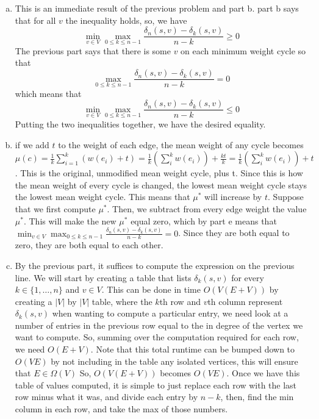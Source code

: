 \documentclass{article}
\begin{document}
\begin{enumerate}[a.]
\item
This is an immediate result of the previous problem and part b. part b says that for all $v$ the inequality holds, so, we have
\[
\min_{v\in V} \max_{0\le k\le n-1} \frac{\delta_n(s,v) - \delta_k(s,v)}{n-k} \ge 0
\]
The previous part says that there is some $v$ on each minimum weight cycle so that
\[
\max_{0\le k\le n-1} \frac{\delta_n(s,v) - \delta_k(s,v)}{n-k} = 0
\]
which means that
\[
\min_{v\in V} \max_{0\le k\le n-1} \frac{\delta_n(s,v) - \delta_k(s,v)}{n-k} \le 0
\]
Putting the two inequalities together, we have the desired equality.

\item
if we add $t$ to the weight of each edge, the mean weight of any cycle becomes $\mu(c)= \frac{1}{k} \sum_{i=1}^k(w(e_i) + t) = \frac{1}{k}\left(\sum_{i}^kw(e_i)\right) + \frac{kt}{k} = \frac{1}{k}\left(\sum_{i}^kw(e_i)\right) + t$. This is the original, unmodified mean weight cycle, plus t. Since this is how the mean weight of every cycle is changed, the lowest mean weight cycle stays the lowest mean weight cycle. This means that $\mu^*$ will increase by $t$. Suppose that we first compute $\mu^*$. Then, we subtract from every edge weight the value $\mu^*$. This will make the new $\mu^*$ equal zero, which by part e means that $\min_{v\in V} \max_{0\le k\le n-1} \frac{\delta_n(s,v) - \delta_k(s,v)}{n-k} =0$. Since they are both equal to zero, they are both equal to each other.

\item
By the previous part, it suffices to compute the expression on the previous line. We will start by creating a table that lists $\delta_k(s,v)$ for every $k\in \{1,\ldots, n\}$ and $v\in V$. This can be done in time $O(V(E+V))$ by creating a $|V|$ by $|V|$ table, where the $k$th row and $v$th column represent $\delta_k(s,v)$ when wanting to compute a particular entry, we need look at a number of entries in the previous row equal to the in degree of the vertex we want to compute. So, summing over the computation required for each row, we need $O(E+V)$. Note that this total runtime can be bumped down to $O(VE)$ by not including in the table any isolated vertices, this will ensure that $E \in \Omega(V)$ So, $O(V(E+V))$ becomes $O(VE)$. Once we have this table of values computed, it is simple to just replace each row with the last row minus what it was, and divide each entry by $n-k$, then, find the min column in each row, and take the max of those numbers.

\end{enumerate}
\end{document}
